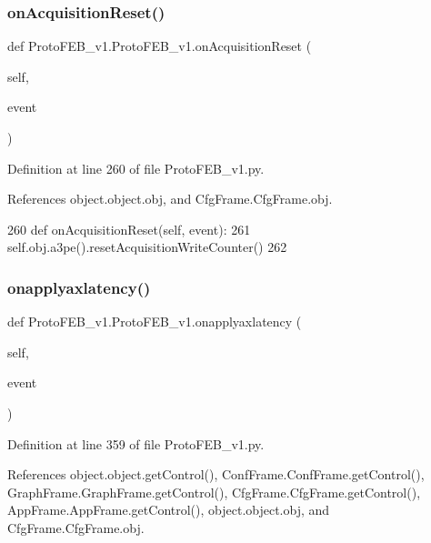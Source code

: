 \subsubsection{\texorpdfstring{on\+Acquisition\+Reset()}{onAcquisitionReset()}}
{\footnotesize\ttfamily def Proto\+F\+E\+B\+\_\+v1.\+Proto\+F\+E\+B\+\_\+v1.\+on\+Acquisition\+Reset (\begin{DoxyParamCaption}\item[{}]{self,  }\item[{}]{event }\end{DoxyParamCaption})}



Definition at line 260 of file Proto\+F\+E\+B\+\_\+v1.\+py.



References object.\+object.\+obj, and Cfg\+Frame.\+Cfg\+Frame.\+obj.


\begin{DoxyCode}
260     \textcolor{keyword}{def }onAcquisitionReset(self, event):
261         self.obj.a3pe().resetAcquisitionWriteCounter()
262 
\end{DoxyCode}
\mbox{\label{classProtoFEB__v1_1_1ProtoFEB__v1_a99efa326b380d20b35277081583d7e1f}} 
\subsubsection{\texorpdfstring{onapplyaxlatency()}{onapplyaxlatency()}}
{\footnotesize\ttfamily def Proto\+F\+E\+B\+\_\+v1.\+Proto\+F\+E\+B\+\_\+v1.\+onapplyaxlatency (\begin{DoxyParamCaption}\item[{}]{self,  }\item[{}]{event }\end{DoxyParamCaption})}



Definition at line 359 of file Proto\+F\+E\+B\+\_\+v1.\+py.



References object.\+object.\+get\+Control(), Conf\+Frame.\+Conf\+Frame.\+get\+Control(), Graph\+Frame.\+Graph\+Frame.\+get\+Control(), Cfg\+Frame.\+Cfg\+Frame.\+get\+Control(), App\+Frame.\+App\+Frame.\+get\+Control(), object.\+object.\+obj, and Cfg\+Frame.\+Cfg\+Frame.\+obj.


